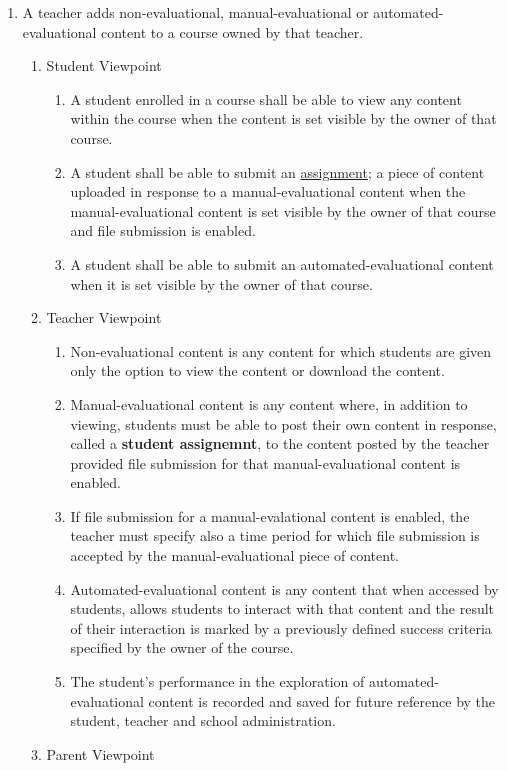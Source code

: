 \documentclass[]{article}
\begin{document}
\begin{enumerate}[{BE}1.]
	\item A teacher adds non-evaluational, manual-evaluational or
automated-evaluational content to a course owned by that teacher.
	\begin{enumerate}[{VP1}.1]
		\item Student Viewpoint
			\begin{enumerate}
				\item A student enrolled in a course shall be able to view any content within
the course when the content is set visible by the owner of that course.
				\item A student shall be able to submit an \underline{assignment}; a
piece of content uploaded in response to a manual-evaluational content when
the manual-evaluational content is set visible by the owner of that course and
file submission is enabled.
				\item A student shall be able to submit an automated-evaluational content
when it is set visible by the owner of that course.
			\end{enumerate}
		\item Teacher Viewpoint
			\begin{enumerate}
				\item Non-evaluational content is any content for which students are given
only the option to view the content or download the content.
				\item Manual-evaluational content is any content where, in addition to
viewing, students must be able to post their own content in response, called a
\textbf{student assignemnt}, to the content posted by the teacher provided file
submission for that manual-evaluational content is enabled.
				\item If file submission for a manual-evalational content is enabled, the
teacher must specify also a time period for which file submission is accepted by
the manual-evaluational piece of content.
				\item Automated-evaluational content is any content that when accessed by
students, allows students to interact with that content and the result of their
interaction is marked by a previously defined success criteria specified by the
owner of the course.
				\item The student's performance in the exploration of automated-evaluational
content is recorded and saved for future reference by the student, teacher and
school administration.
			\end{enumerate}
		\item Parent Viewpoint

\end{enumerate}
\end{enumerate}
\end{document}
